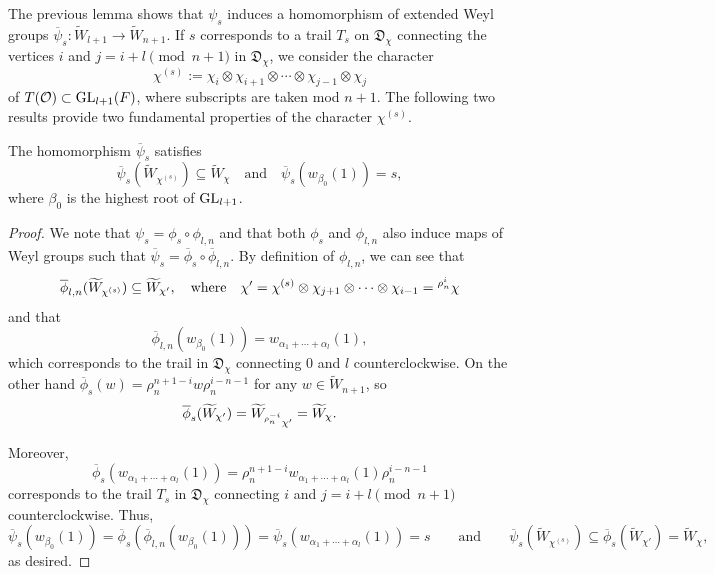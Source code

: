     The previous lemma shows that $\psi_s$ induces a homomorphism of extended Weyl groups $\overline{\psi}_s:\widetilde{W}_{l+1}\rightarrow\widetilde{W}_{n+1}$. If $s$ corresponds to a trail $T_s$ on $\mathfrak{D}_\chi$ connecting the vertices $i$ and $j=i+l\pmod{n+1}$ in $\mathfrak{D}_\chi$, we consider the character $$\chi^{(s)}:=\chi_i\otimes\chi_{i+1}\otimes\cdots\otimes\chi_{j-1}\otimes\chi_j$$
    of $T(\mathcal{O})\subset\mathrm{GL}_{l+1}(F)$, where subscripts are taken mod $n+1$. The following two results provide two fundamental properties of the character $\chi^{(s)}$.

    \begin{lemma}\label{lem_hompsi_s}
        The homomorphism $\overline{\psi}_s$ satisfies 
        \begin{equation*}
            \overline{\psi}_s(\widetilde{W}_{\chi^{(s)}})\subseteq\widetilde{W}_\chi\quad\text{and}\quad\overline{\psi}_s(w_{\beta_0}(1))=s,
        \end{equation*}
        where $\beta_0$ is the highest root of $\mathrm{GL}_{l+1}$.
    \end{lemma}
    \begin{proof}
        We note that $\psi_s=\phi_s\circ\phi_{l,n}$ and that both $\phi_s$ and $\phi_{l,n}$ also induce maps of Weyl groups such that 
        $\overline{\psi}_s=\overline{\phi}_s\circ\overline{\phi}_{l,n}$. 
        By definition of $\phi_{l,n}$, we can see that $$\overline{\phi}_{l,n}(\widetilde{W}_{\chi^{(s)}})\subseteq\widetilde{W}_{\chi'},\quad\text{where}\quad\chi'=\chi^{(s)}\otimes\chi_{j+1}\otimes\cdots\otimes\chi_{i-1}=\prescript{\rho_n^i}{}{\chi}$$
        and that 
        $$\overline{\phi}_{l,n}(w_{\beta_0}(1))=w_{\alpha_1+\cdots+\alpha_l}(1),$$ 
        which corresponds to the trail in $\mathfrak{D}_\chi$ connecting $0$ and $l$ counterclockwise. On the other hand $\overline{\phi}_s(w)=\rho_n^{n+1-i}w\rho_n^{i-n-1}$ for any $w\in\widetilde{W}_{n+1}$, so $$\overline{\phi}_s(\widetilde{W}_{\chi'})=\widetilde{W}_{\prescript{\rho_n^{-i}}{}{\chi'}}=\widetilde{W}_\chi.$$

        Moreover, 
        $$\overline{\phi}_s(w_{\alpha_1+\cdots+\alpha_l}(1))=\rho_n^{n+1-i}w_{\alpha_1+\cdots+\alpha_l}(1)\rho_n^{i-n-1}$$
        corresponds to the trail $T_s$ in $\mathfrak{D}_\chi$ connecting $i$ and $j=i+l\pmod{n+1}$ counterclockwise. Thus,
        $$\overline{\psi}_s(w_{\beta_0}(1))=\overline{\phi}_s(\overline{\phi}_{l,n}(w_{\beta_0}(1)))=\overline{\psi}_s(w_{\alpha_1+\cdots+\alpha_l}(1))=s\quad\quad\text{and}\quad\quad\overline{\psi}_s(\widetilde{W}_{\chi^{(s)}})\subseteq\overline{\phi}_s(\widetilde{W}_{\chi'})=\widetilde{W}_\chi,$$
        as desired.
    \end{proof}

